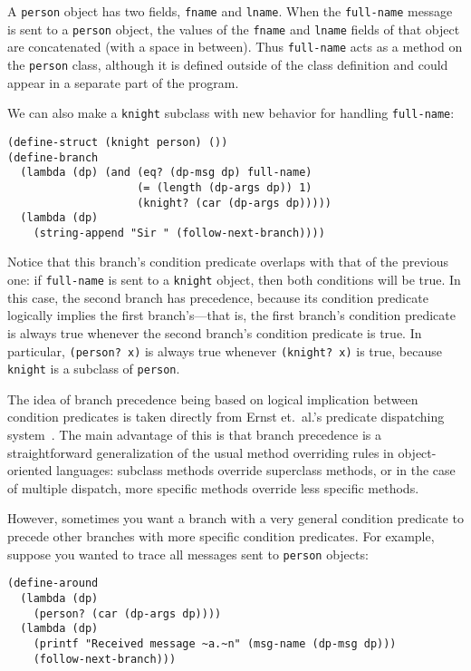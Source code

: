\documentclass{article}
\newcommand{\code}[1]{\texttt{#1}}
\begin{document}
A \code{person} object has two fields, \code{fname} and \code{lname}.
When the \code{full-name} message is sent to a \code{person} object,
the values of the \code{fname} and \code{lname} fields of that object
are concatenated (with a space in between).  Thus \code{full-name} acts
as a method on the \code{person} class, although it is defined outside
of the class definition and could appear in a separate part of the
program.

We can also make a \code{knight} subclass with new behavior for
handling \code{full-name}:

\begin{verbatim}
(define-struct (knight person) ())
(define-branch
  (lambda (dp) (and (eq? (dp-msg dp) full-name)
                    (= (length (dp-args dp)) 1)
                    (knight? (car (dp-args dp)))))
  (lambda (dp)
    (string-append "Sir " (follow-next-branch))))
\end{verbatim}

Notice that this branch's condition predicate overlaps with that of
the previous one: if \code{full-name} is sent to a \code{knight}
object, then both conditions will be true.  In this case, the second
branch has precedence, because its condition predicate logically
implies the first branch's---that is, the first branch's condition
predicate is always true whenever the second branch's condition
predicate is true.  In particular, \code{(person?\ x)} is always true
whenever \code{(knight?\ x)} is true, because \code{knight} is a
subclass of \code{person}.

The idea of branch precedence being based on logical implication
between condition predicates is taken directly from Ernst et.~al.'s
predicate dispatching system~\cite{predicate-dispatch}.  The main
advantage of this is that branch precedence is a straightforward
generalization of the usual method overriding rules in object-oriented
languages: subclass methods override superclass methods, or in the
case of multiple dispatch, more specific methods override less
specific methods.

However, sometimes you want a branch with a very general condition
predicate to precede other branches with more specific condition
predicates.  For example, suppose you wanted to trace all messages
sent to \code{person} objects:

\begin{verbatim}
(define-around
  (lambda (dp)
    (person? (car (dp-args dp))))
  (lambda (dp)
    (printf "Received message ~a.~n" (msg-name (dp-msg dp)))
    (follow-next-branch)))
\end{verbatim}
\end{document}
